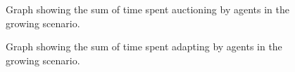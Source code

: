\begin{figure}[H]
    \centering
        
    \caption{Graph showing the sum of time spent auctioning by agents in the growing scenario.}
    \label{fig:auctioning-time-growing}
\end{figure}
\begin{figure}[H]
    \centering
        
    \caption{Graph showing the sum of time spent adapting by agents in the growing scenario.}
    \label{fig:adapting-time-growing}
\end{figure}
